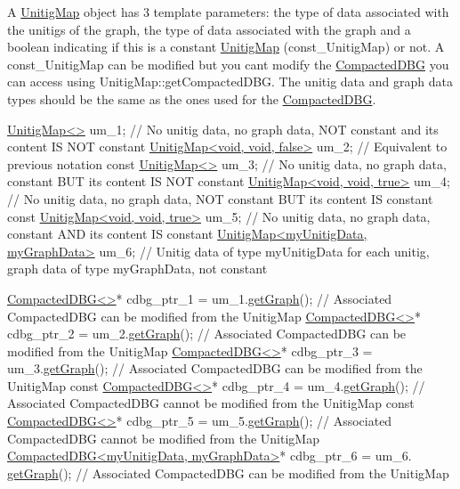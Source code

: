 A \hyperlink{classUnitigMap}{Unitig\+Map} object has 3 template parameters\+: the type of data associated with the unitigs of the graph, the type of data associated with the graph and a boolean indicating if this is a constant \hyperlink{classUnitigMap}{Unitig\+Map} (const\+\_\+\+Unitig\+Map) or not. A const\+\_\+\+Unitig\+Map can be modified but you can\textquotesingle{}t modify the \hyperlink{classCompactedDBG}{Compacted\+D\+BG} you can access using Unitig\+Map\+::get\+Compacted\+D\+BG. The unitig data and graph data types should be the same as the ones used for the \hyperlink{classCompactedDBG}{Compacted\+D\+BG}. 
\begin{DoxyCode}
\hyperlink{classUnitigMap}{UnitigMap<>} um\_1; \textcolor{comment}{// No unitig data, no graph data, NOT constant and its content IS NOT constant}
\hyperlink{classUnitigMap}{UnitigMap<void, void, false>} um\_2; \textcolor{comment}{// Equivalent to previous notation}
\textcolor{keyword}{const} \hyperlink{classUnitigMap}{UnitigMap<>} um\_3; \textcolor{comment}{// No unitig data, no graph data, constant BUT its content IS NOT
       constant}
\hyperlink{classUnitigMap}{UnitigMap<void, void, true>} um\_4; \textcolor{comment}{// No unitig data, no graph data, NOT constant
       BUT its content IS constant}
\textcolor{keyword}{const} \hyperlink{classUnitigMap}{UnitigMap<void, void, true>} um\_5; \textcolor{comment}{// No unitig data, no graph data,
       constant AND its content IS constant}
\hyperlink{classUnitigMap}{UnitigMap<myUnitigData, myGraphData>} um\_6; \textcolor{comment}{// Unitig data of type
       myUnitigData for each unitig, graph data of type myGraphData, not constant}

\hyperlink{classCompactedDBG}{CompactedDBG<>}* cdbg\_ptr\_1 = um\_1.\hyperlink{classUnitigMap_ab6bc6b4a479bef4a7cb9c72806679f5e}{getGraph}(); \textcolor{comment}{// Associated CompactedDBG can be
       modified from the UnitigMap}
\hyperlink{classCompactedDBG}{CompactedDBG<>}* cdbg\_ptr\_2 = um\_2.\hyperlink{classUnitigMap_ab6bc6b4a479bef4a7cb9c72806679f5e}{getGraph}(); \textcolor{comment}{// Associated CompactedDBG can be
       modified from the UnitigMap}
\hyperlink{classCompactedDBG}{CompactedDBG<>}* cdbg\_ptr\_3 = um\_3.\hyperlink{classUnitigMap_ab6bc6b4a479bef4a7cb9c72806679f5e}{getGraph}(); \textcolor{comment}{// Associated CompactedDBG can be
       modified from the UnitigMap}
\textcolor{keyword}{const} \hyperlink{classCompactedDBG}{CompactedDBG<>}* cdbg\_ptr\_4 = um\_4.\hyperlink{classUnitigMap_ab6bc6b4a479bef4a7cb9c72806679f5e}{getGraph}(); \textcolor{comment}{// Associated CompactedDBG cannot
       be modified from the UnitigMap}
\textcolor{keyword}{const} \hyperlink{classCompactedDBG}{CompactedDBG<>}* cdbg\_ptr\_5 = um\_5.\hyperlink{classUnitigMap_ab6bc6b4a479bef4a7cb9c72806679f5e}{getGraph}(); \textcolor{comment}{// Associated CompactedDBG cannot
       be modified from the UnitigMap}
\hyperlink{classCompactedDBG}{CompactedDBG<myUnitigData, myGraphData>}* cdbg\_ptr\_6 = um\_6.
      \hyperlink{classUnitigMap_ab6bc6b4a479bef4a7cb9c72806679f5e}{getGraph}(); \textcolor{comment}{// Associated CompactedDBG can be modified from the UnitigMap}
\end{DoxyCode}
 

